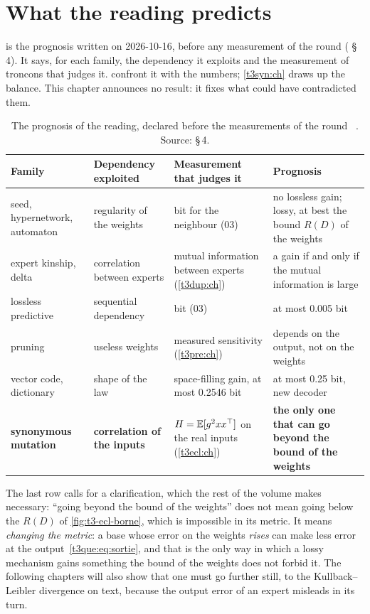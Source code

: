 \section{What the reading predicts}\label{t3que:sec:prediction}

 is the prognosis written on 2026-10-16, before any measurement of the round ( §\,4). It says, for each family, the dependency it exploits and the measurement of troncons that judges it.  confront it with the numbers; \cref{t3syn:ch} draws up the balance. This chapter announces no result: it fixes what could have contradicted them.

\begin{table}[tbp]
\centering\small
\begin{tabularx}{\linewidth}{>{\raggedright\arraybackslash}p{2.6cm} >{\raggedright\arraybackslash}X >{\raggedright\arraybackslash}X >{\raggedright\arraybackslash}X}
\toprule
Family & Dependency exploited & Measurement that judges it & Prognosis \\
\midrule
seed, hypernetwork, automaton & regularity of the weights & 0.005 bit for the neighbour (03) & no lossless gain; lossy, at best the bound $R(D)$ of the weights \\
expert kinship, delta & correlation between experts & mutual information between experts (\cref{t3dup:ch}) & a gain if and only if the mutual information is large \\
lossless predictive & sequential dependency & 0.005 bit (03) & at most 0.005 bit \\
pruning & useless weights & measured sensitivity (\cref{t3pre:ch}) & depends on the output, not on the weights \\
vector code, dictionary & shape of the law & space-filling gain, at most 0.2546 bit & at most 0.25 bit, new decoder \\
\textbf{synonymous mutation} & \textbf{correlation of the inputs} & $H = \mathbb{E}[g^2 x x^\top]$ on the real inputs (\cref{t3ecl:ch}) & \textbf{the only one that can go beyond the bound of the weights} \\
\bottomrule
\end{tabularx}
\caption[The prognosis of the reading]{The prognosis of the reading, declared before the measurements of the round \calc~\litt. Source:  §\,4.}
\label{t3que:tab:pronostic}
\end{table}

The last row calls for a clarification, which the rest of the volume makes necessary: ``going beyond the bound of the weights'' does not mean going below the $R(D)$ of \cref{fig:t3-ecl-borne}, which is impossible in its metric. It means \emph{changing the metric}: a base whose error on the weights \emph{rises} can make less error at the output~\eqref{t3que:eq:sortie}, and that is the only way in which a lossy mechanism gains something the bound of the weights does not forbid it. The following chapters will also show that one must go further still, to the Kullback--Leibler divergence on text, because the output error of an expert misleads in its turn.

